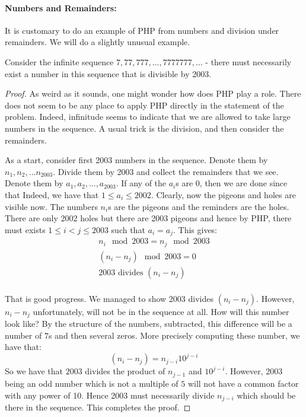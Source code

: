 \paragraph{Numbers and Remainders:}

It is customary to do an example of PHP from numbers and division under remainders. We will do a slightly unusual example. 

\begin{theorem}
Consider the infinite sequence $7, 77, 777, \ldots ,7777777, \ldots $ - there must necessarily exist a number in this sequence that is divisible by 2003.
\end{theorem}
\begin{proof}
As weird as it sounds, one might wonder how does PHP play a role. There does not seem to be any place to apply PHP directly in the statement of the problem. Indeed, infinitude seems to indicate that we are allowed to take large numbers in the sequence. A usual trick is the division, and then consider the remainders.

As a start, consider  first 2003 numbers in the sequence. Denote them by $n_1, n_2, \ldots n_{2003}$. Divide them by 2003 and collect the remainders that we see. Denote them by $a_1, a_2, \ldots, a_{2003}$. If any of the $a_i$s are 0, then we are done since that  Indeed, we have that $1 \le a_i \le 2002$. Clearly, now the pigeons and holes are visible now. The numbers $n_i$s are the pigeons and the reminders are the holes. There are only 2002 holes but there are 2003 pigeons and hence by PHP, there must exists $1 \le i < j \le 2003$ such that $a_i = a_j$. This gives:
\begin{eqnarray}
n_i  \mod 2003 = n_j \mod 2003 \\
(n_i - n_j) \mod 2003 =  0\\
2003 \textrm{ divides } (n_i - n_j) \\
\end{eqnarray}

That is good progress. We managed to show 2003 divides $(n_i - n_j)$. However, $n_i - n_j$ unfortunately, will not be in the sequence at all. How will this number look like? By the structure of the numbers, subtracted, this difference will be a number of $7$s and then several zeros. More precisely computing these number, we have that:
$$(n_i - n_j) = n_{j-i} 10^{j-i}$$
So we have that $2003$ divides the product of $n_{j-1}$ and $10^{j-i}$. However, 2003 being an odd number which is not a multiple of $5$ will not have a common factor with any power of 10. Hence 2003 must necessarily divide $n_{j-i}$ which should be there in the sequence. This completes the proof.
\end{proof}

